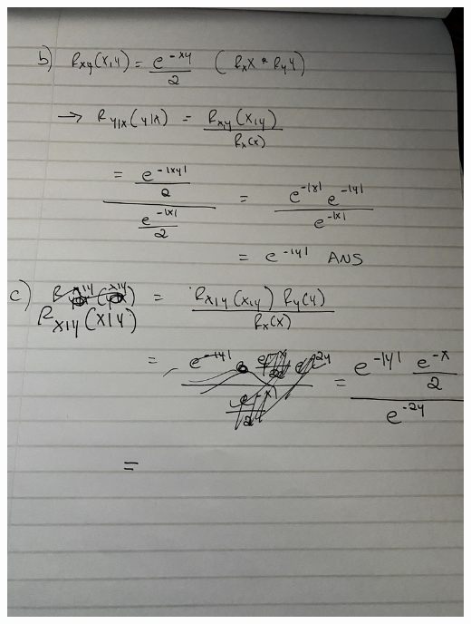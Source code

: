 \documentclass[11pt]{article} %
\begin{document}
\begin{center}
\includegraphics[scale = 0.15]{IMG_1691.jpg}
\end{center}
\end{document}
